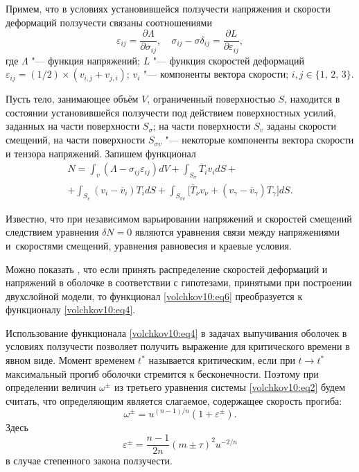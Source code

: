 \smallskip

Примем, что в условиях установившейся ползучести напряжения и скорости деформаций ползучести  связаны соотношениями
\begin{equation}
\label{volchkov10:eq5}
\varepsilon_{ij}=\frac{\partial \Lambda}{\partial \sigma_{ij}},\quad
\sigma_{ij}-\sigma\delta_{ij}=\frac{\partial L}{\partial \varepsilon_{ij}},
\end{equation}
где $\Lambda$ "--- функция напряжений; $L$ "--- функция скоростей деформаций
$\varepsilon_{ij}{=}(1/2)\times(v_{i,j}+v_{j,i})$; $v_i$ "--- компоненты вектора скорости; $i, j\in \{1,\,2,\,3\}$.

Пусть тело, занимающее объём $V$, ограниченный поверхностью $S$, находится в состоянии
установившейся ползучести под действием поверхностных усилий, заданных на части
поверхности $S_\sigma$; на части поверхности $S_v$ заданы скорости смещений, на части
поверхности $S_{\sigma v}$ "--- некоторые компоненты вектора скорости и тензора
напряжений. Запишем функционал
\begin{multline}
\label{volchkov10:eq6}
N=\int_v(\Lambda-\sigma_{ij}\varepsilon_{ij})dV + \int _{S_\sigma}\overline{T}_i v_i dS+\\
+\int_{S_v}(v_i-\overline{v}_i)T_i dS+\int _{S_{\sigma v}}\bigl[\overline{T}_\nu
v_\nu+(v_\gamma-\overline{v}_\gamma)T_\gamma\bigr]dS.
\end{multline}

Известно, что при независимом варьировании напряжений и скоростей смещений следствием
уравнения $\delta N=0$  являются уравнения связи между напряжениями и~скоростями
смещений, уравнения равновесия и краевые условия.

Можно показать \cite{volchkov:V4}, что если принять распределение скоростей деформаций и
напряжений в оболочке в соответствии с гипотезами, принятыми при построении двухслойной
модели, то функционал \eqref{volchkov10:eq6} преобразуется к функционалу \eqref{volchkov10:eq4}.

\smallskip

 Использование функционала \eqref{volchkov10:eq4} в задачах выпучивания оболочек в
условиях ползучести позволяет получить выражение для критического времени в явном виде.
Момент временем $t^{*}$ называется критическим, если при $t\rightarrow t^{*}$
максимальный прогиб оболочки стремится к бесконечности. Поэтому при определении величин
$\omega^{\pm}$ из третьего уравнения системы \eqref{volchkov10:eq2} будем считать, что определяющим
является слагаемое, содержащее скорость прогиба:
\begin{equation}
\label{volchkov10:eq7}
\omega^{\pm}=u^{(n-1)/n}(1+\varepsilon^{\pm}).
\end{equation}
Здесь
\begin{equation*}
\varepsilon^{\pm}=\frac{n-1}{2n}(m\pm\tau)^2u^{-2/n}
\end{equation*}
в случае степенного закона ползучести.

